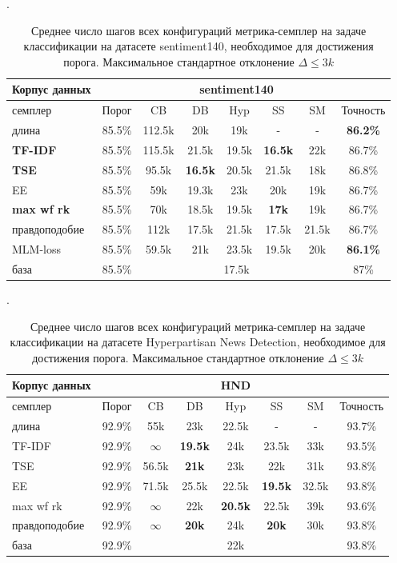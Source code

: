 \documentclass{spbau-diploma}
\begin{document}
\begin{table}[h]
	\caption{Среднее число шагов всех конфигураций метрика-семплер на задаче классификации на датасете sentiment140, необходимое для достижения порога. Максимальное стандартное отклонение $\Delta \le 3k$}.
	\label{table:s140_fine_tuning}
	\centering
	\begin{tabular}{l|c|ccccc|c}
		Корпус данных & & \multicolumn{5}{c}{sentiment140}&\\
		\hline
		семплер & Порог & CB & DB & Hyp & SS & SM & Точность\\
		\hline
		длина & 85.5\% & 112.5k & 20k & 19k & - & - & {\bf 86.2\%} \\
		{\bf TF-IDF} & 85.5\% & 115.5k & 21.5k & 19.5k & {\bf 16.5k} & 22k & 86.7\% \\
		{\bf TSE} & 85.5\% & 95.5k & {\bf 16.5k} & 20.5k & 21.5k & 18k & 86.8\% \\
		EE & 85.5\% & 59k & 19.3k & 23k & 20k & 19k & 86.7\% \\
		{\bf max wf rk} & 85.5\% & 70k & 18.5k & 19.5k & {\bf 17k} & 19k & 86.7\% \\
		правдоподобие & 85.5\% & 112k & 17.5k & 21.5k & 17.5k & 21.5k & 86.7\% \\
		MLM-loss & 85.5\% & 59.5k & 21k & 23.5k & 19.5k & 20k & {\bf 86.1\%} \\
		\hline
		база & 85.5\% & \multicolumn{5}{c}{17.5k} & 87\%
	\end{tabular}
\end{table}

\begin{table}[h]
	\caption{Среднее число шагов всех конфигураций метрика-семплер на задаче классификации на датасете Hyperpartisan News Detection, необходимое для достижения порога. Максимальное стандартное отклонение $\Delta \le 3k$}.
	\label{table:hnd_fine_tuning}
	\centering
	\begin{tabular}{l|c|ccccc|c}
		Корпус данных & & \multicolumn{5}{c}{HND}&\\
		\hline
		семплер & Порог & CB & DB & Hyp & SS & SM & Точность\\
		\hline
		длина & 92.9\% & 55k & 23k & 22.5k & - & - & 93.7\% \\
		TF-IDF & 92.9\%  & $\infty$ & {\bf 19.5k} & 24k & 23.5k & 33k & 93.5\% \\
		TSE & 92.9\% & 56.5k & {\bf 21k} & 23k & 22k & 31k & 93.8\% \\
		EE & 92.9\%  & 71.5k & 25.5k & 22.5k & {\bf 19.5k} & 32.5k & 93.8\% \\
		max wf rk & 92.9\%  & $\infty$ & 22k & {\bf 20.5k} & 22.5k & 39k & 93.6\% \\
		правдоподобие & 92.9\%  & $\infty$ & {\bf 20k} & 24k & {\bf 20k} & 30k & 93.8\% \\
		\hline
		база & 92.9\%  & \multicolumn{5}{c}{22k} & 93.8\%
	\end{tabular}
\end{table}
\end{document}
